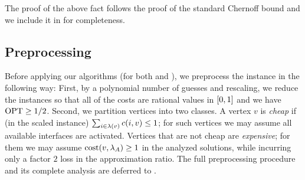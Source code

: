 The proof of the above fact follows the proof of the standard Chernoff bound and we include it in  for completeness.

\subsection{Preprocessing}
Before applying our algorithms (for both \coverage and \connectivity), we preprocess the instance in the following way: First, by a polynomial number of guesses and rescaling, we reduce the instances so that all of the costs are rational values in $\mathopen{}\left[ 0,1 \right]$ and we have $\textnormal{OPT}\geq 1/2$. Second, we partition vertices into two classes. A vertex $v$ is \emph{cheap} if (in the scaled instance) $\sum_{i\in\lambda\mathopen{}\left( v \right)} c\mathopen{}\left( i,v \right)\leq 1$; for such vertices we may assume all available interfaces are activated. Vertices that are not cheap are \emph{expensive}; for them we may assume $\textnormal{cost}\mathopen{}\left( v,\lambda_A \right)\geq 1$ in the analyzed solutions, while incurring only a factor $2$ loss in the approximation ratio. The full preprocessing procedure and its complete analysis are deferred to .